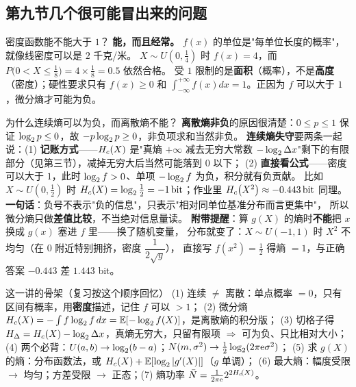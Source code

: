 \subsection{第九节\quad 几个很可能冒出来的问题}

\begin{qa}{密度函数能不能大于 $1$？}
\textbf{能，而且经常。} $f(x)$ 的单位是"每单位长度的概率"，就像线密度可以是 $2$ 千克/米。
$X\sim U(0,\tfrac14)$ 时 $f(x)=4$，而 $P\bigl(0<X\le\tfrac18\bigr)=4\times\tfrac18=0.5$ 依然合格。
受 $1$ 限制的是\textbf{面积}（概率），不是\textbf{高度}（密度）；硬性要求只有 $f(x)\ge0$ 和
$\int_{-\infty}^{+\infty}f(x)dx=1$。正因为 $f$ 可以大于 $1$，微分熵才可能为负。
\end{qa}

\begin{qa}{为什么连续熵可以为负，而离散熵不能？}
\textbf{离散熵非负}的原因很清楚：$0\le p\le1$ 保证 $\log_{2} p\le0$，故 $-p\log_{2} p\ge0$，非负项求和当然非负。
\textbf{连续熵失守}要两条一起说：(1) \textbf{记账方式}——$H_{c}\!\left(X\right)$ 是"真熵 $+\infty$ 减去无穷大常数
$-\log_{2}\Delta x$"剩下的有限部分（见第三节），减掉无穷大后当然可能落到 $0$ 以下；
(2) \textbf{直接看公式}——密度可以大于 $1$，此时 $\log_{2} f>0$、单项 $-\log_{2} f$ 为负，积分就有负贡献。
比如 $X\sim U(0,\tfrac12)$ 时 $H_{c}\!\left(X\right)=\log_{2}\tfrac12=-1\,\text{bit}$；作业里 $H_{c}\!\left(X^2\right)\approx-0.443\,\text{bit}$ 同理。
\textbf{一句话}：负号不表示"负的信息"，只表示"相对同单位基准分布而言更集中"，
所以微分熵只做\textbf{差值比较}，不当绝对信息量读。
\textbf{附带提醒}：算 $g(X)$ 的熵时\textbf{不能}把 $x$ 换成 $g(x)$ 塞进 $f$ 里——换了随机变量，
分布就变了：$X\sim U(-1,1)$ 时 $X^2$ 不均匀（在 $0$ 附近特别拥挤，密度 $\dfrac{1}{2\sqrt y}$），
直接写 $f(x^2)=\tfrac12$ 得熵 $=1$，与正确答案 $-0.443$ 差 $1.443$ bit。
\end{qa}

\begin{idea}{这一讲的骨架（复习按这个顺序回忆）}
(1) 连续 $\ne$ 离散：单点概率 $=0$，只有区间有概率，用\textbf{密度}描述，记住 $f$ 可以 $>1$；
(2) 微分熵 $H_{c}\!\left(X\right)=-\int f\log_{2} f\,dx=\operatorname{\mathbb{E}}[-\log_{2} f(X)]$，是离散熵的积分版；
(3) 切格子得 $H_\Delta=H_{c}\!\left(X\right)-\log_{2}\Delta x$，真熵无穷大，只留有限项 $\Rightarrow$ 可为负、只比相对大小；
(4) 两个必背：$U(a,b)\to\log_{2}(b-a)$；$N(m,\sigma^2)\to\frac12\log_{2}(2\pi\mathrm{e}\sigma^2)$；
(5) 求 $g(X)$ 的熵：分布函数法，或 $H_{c}\!\left(X\right)+\operatorname{\mathbb{E}}[\log_{2}|g'(X)|]$（$g$ 单调）；
(6) 最大熵：幅度受限 $\to$ 均匀；方差受限 $\to$ 正态；(7) 熵功率
$\bar N=\frac{1}{2\pi\mathrm{e}}2^{2H_{c}\!\left(X\right)}$。
\end{idea}
